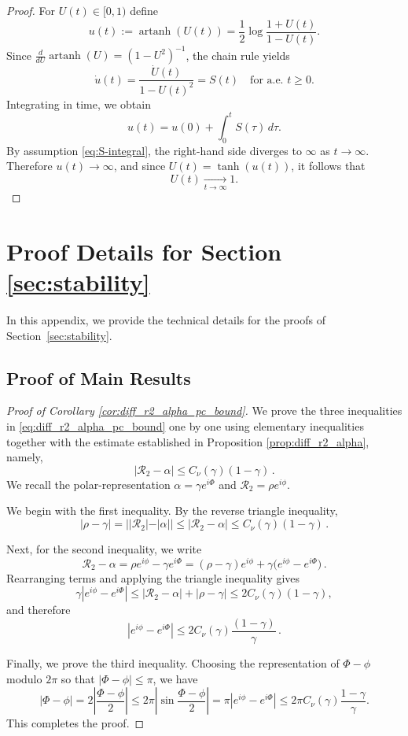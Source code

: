 \documentclass[10pt]{article}
\theoremstyle{definition}
\theoremstyle{definition}
\numberwithin{equation}{section}
\newcommand{\CR}{\mathcal{R}}
\begin{document}
\begin{proof}
For $U(t)\in[0,1)$ define
\[
u(t):=\operatorname{artanh}(U(t))
=\frac12\log\frac{1+U(t)}{1-U(t)} .
\]
Since $\frac{d}{dU}\operatorname{artanh}(U)=(1-U^2)^{-1}$, the chain rule yields
\[
\dot u(t)=\frac{\dot U(t)}{1-U(t)^2}=S(t)
\quad\text{for a.e.\ }t\ge0 .
\]
Integrating in time, we obtain
\[
u(t)=u(0)+\int_0^t S(\tau)\,d\tau .
\]
By assumption \eqref{eq:S-integral}, the right-hand side diverges to $\infty$ as $t\to\infty$.
Therefore $u(t)\to\infty$, and since $U(t)=\tanh(u(t))$, it follows that
\[
U(t)\xrightarrow[t\to\infty]{}1 .
\]
\end{proof}


\section{Proof Details for Section \ref{sec:stability}}\label{app:stability}
In this appendix, we provide the technical details for the proofs of Section~\ref{sec:stability}.

\subsection{Proof of Main Results}

\begin{proof}[Proof of Corollary \ref{cor:diff_r2_alpha_pc_bound}]
We prove the three inequalities in \eqref{eq:diff_r2_alpha_pc_bound} one by one using elementary inequalities together with the estimate established in Proposition \ref{prop:diff_r2_alpha}, namely,
\begin{equation*}
|\CR_2 - \alpha| \leq C_{\nu}(\gamma) (1 - \gamma) \, .
\end{equation*}
We recall the polar-representation $\alpha = \gamma e^{i\Phi}$ and $\CR_2 = \rho e^{i\phi}$.

We begin with the first inequality. By the reverse triangle inequality,
\begin{equation*}
|\rho - \gamma| = ||\CR_2|-|\alpha||\leq |\CR_2-\alpha| \leq C_{\nu}(\gamma) (1 - \gamma) \, . 
\end{equation*}
 
Next, for the second inequality, we write
\[
\CR_2-\alpha = \rho e^{i\phi}-\gamma e^{i\Phi} = (\rho-\gamma)e^{i\phi} + \gamma\bigl(e^{i\phi}-e^{i\Phi}\bigr) \, .
\]
Rearranging terms and applying the triangle inequality gives
\[
\gamma |e^{i\phi}-e^{i\Phi}| \leq |\CR_2-\alpha|+|\rho-\gamma| \leq 2C_\nu(\gamma)(1-\gamma),
\]
and therefore
\begin{equation*}
    |e^{i\phi}-e^{i\Phi}| \leq 2C_\nu(\gamma) \frac{(1-\gamma)}{\gamma} \, .
\end{equation*}

Finally, we prove the third inequality. Choosing the representation of $\Phi - \phi$ modulo $2\pi$ so that $|\Phi-\phi|\leq \pi$, we have
\[
|\Phi-\phi|
=
2\left|\frac{\Phi-\phi}{2}\right|
\leq
2\pi \left|\sin\frac{\Phi-\phi}{2}\right| = \pi |e^{i\phi}-e^{i\Phi}|
\leq
2\pi C_\nu(\gamma) \frac{1-\gamma}{\gamma}.
\]
This completes the proof.
\end{proof}
\end{document}
